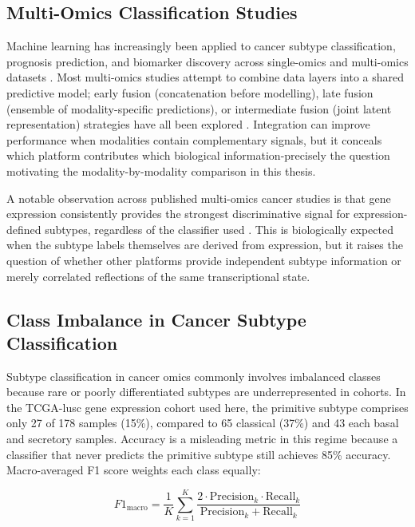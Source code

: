 \subsection{Multi-Omics Classification Studies}

Machine learning has increasingly been applied to cancer subtype classification, prognosis prediction, and biomarker discovery across single-omics and multi-omics datasets \parencite{Picard2021, Nicora2020}. Most multi-omics studies attempt to combine data layers into a shared predictive model; early fusion (concatenation before modelling), late fusion (ensemble of modality-specific predictions), or intermediate fusion (joint latent representation) strategies have all been explored \parencite{Picard2021}. Integration can improve performance when modalities contain complementary signals, but it conceals which platform contributes which biological information-precisely the question motivating the modality-by-modality comparison in this thesis.
 
A notable observation across published multi-omics cancer studies is that gene expression consistently provides the strongest discriminative signal for expression-defined subtypes, regardless of the classifier used \parencite{Hoadley2018}. This is biologically expected when the subtype labels themselves are derived from expression, but it raises the question of whether other platforms provide independent subtype information or merely correlated reflections of the same transcriptional state.

\subsection{Class Imbalance in Cancer Subtype Classification}
Subtype classification in cancer omics commonly involves imbalanced classes because rare or poorly differentiated subtypes are underrepresented in cohorts. In the TCGA-\gls{lusc} gene expression cohort used here, the primitive subtype comprises only 27 of 178 samples (15\%), compared to 65 classical (37\%) and 43 each basal and secretory samples. Accuracy is a misleading metric in this regime because a classifier that never predicts the primitive subtype still achieves 85\% accuracy. Macro-averaged F1 score weights each class equally:
 
\begin{equation}
F1_{\mathrm{macro}} = \frac{1}{K}\sum_{k=1}^{K}
    \frac{2 \cdot \mathrm{Precision}_k \cdot \mathrm{Recall}_k}
         {\mathrm{Precision}_k + \mathrm{Recall}_k}
\label{eq:macro_f1}
\end{equation}
 
